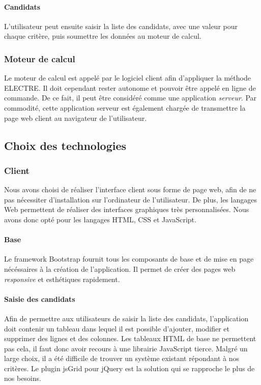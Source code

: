 \documentclass[a4paper]{article}
\begin{document}
\paragraph{Candidats} L'utilisateur peut ensuite saisir la liste des candidats, avec une valeur pour chaque critère, puis soumettre les données au moteur de calcul.

\subsubsection{Moteur de calcul}

Le moteur de calcul est appelé par le logiciel client afin d'appliquer la méthode ELECTRE. Il doit cependant rester autonome et pouvoir être appelé en ligne de commande. De ce fait, il peut être considéré comme une application \textit{serveur}. Par commodité, cette application serveur est également chargée de transmettre la page web client au navigateur de l'utilisateur.

\newpage

\subsection{Choix des technologies}

\subsubsection{Client}

Nous avons choisi de réaliser l'interface client sous forme de page web, afin de ne pas nécessiter d'installation sur l'ordinateur de l'utilisateur. De plus, les langages Web permettent de réaliser des interfaces graphiques très personnalisées. Nous avons donc opté pour les langages HTML, CSS et JavaScript.

\paragraph{Base} Le framework Bootstrap fournit tous les composants de base et de mise en page nécéssaires à la création de l'application. Il permet de créer des pages web \textit{responsive} et esthétiques rapidement. 

\paragraph{Saisie des candidats} Afin de permettre aux utilisateurs de saisir la liste des candidats, l'application doit contenir un tableau dans lequel il est possible d'ajouter, modifier et supprimer des lignes et des colonnes. Les tableaux HTML de base ne permettent pas cela, il faut donc avoir recours à une librairie JavaScript tierce. Malgré un large choix, il a été difficile de trouver un système existant répondant à nos critères. Le plugin jsGrid pour jQuery est la solution qui se rapproche le plus de nos besoins.
\end{document}
